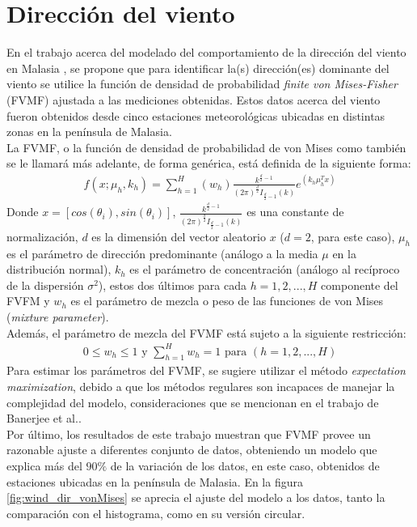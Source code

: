 \section{Dirección del viento}
En el trabajo acerca del modelado del comportamiento de la dirección del viento en Malasia \cite{Winddirelse15}, se propone que para identificar la(s) dirección(es) dominante del viento se utilice la función de densidad de probabilidad \emph{finite von Mises-Fisher} (FVMF) ajustada a las mediciones obtenidas. Estos datos acerca del viento fueron obtenidos desde cinco estaciones meteorológicas ubicadas en distintas zonas en la península de Malasia.\\
La FVMF, o la función de densidad de probabilidad de von Mises como también se le llamará más adelante, de forma genérica, está definida de la siguiente forma:
\begin{align}
    f(x;\mu_{h}, k_{h}) = \sum_{h=1}^{H}(w_{h})\frac{k^{\frac{d}{2} - 1}}{(2\pi)^{\frac{d}{2}}I_{\frac{d}{2} - 1} (k)}e^{(k_h\mu_{h}^{T}x)}
\end{align}    
Donde $x=[cos(\theta_i), sin(\theta_i)]$, $\frac{k^{\frac{d}{2} - 1}}{(2\pi)^{\frac{d}{2}}I_{\frac{d}{2} - 1} (k)}$ es una constante de normalización, $d$ es la dimensión del vector aleatorio $x$ ($d = 2$, para este caso), $\mu_{h}$ es el parámetro de dirección predominante (análogo a la media $\mu$ en la distribución normal), $k_h$ es el parámetro de concentración (análogo al recíproco de la dispersión $\sigma^{2}$), estos dos últimos para cada $h = 1, 2,...,H$ componente del FVFM y $w_h$ es el parámetro de mezcla o peso de las funciones de von Mises (\emph{mixture parameter}).\\
Además, el parámetro de mezcla del FVMF está sujeto a la siguiente restricción:
\begin{align}\label{eq:WeightConstraint}
    0 \leq w_h \leq 1 \text{ y } \sum_{h=1}^{H} w_{h} = 1 \text{ para } (h=1,2,...,H) 
\end{align}
Para estimar los parámetros del FVMF, se sugiere utilizar el método \emph{expectation maximization}, debido a que los métodos regulares son incapaces de manejar la complejidad del modelo, consideraciones que se mencionan en el trabajo de Banerjee et al.\cite{Banerjee05}.\\
Por último, los resultados de este trabajo muestran que FVMF provee un razonable ajuste a diferentes conjunto de datos, obteniendo un modelo que explica más del $90\%$ de la variación de los datos, en este caso, obtenidos de estaciones ubicadas en la península de Malasia. En la figura \ref{fig:wind_dir_vonMises} se aprecia el ajuste del modelo a los datos, tanto la comparación con el histograma, como en su versión circular.\\
